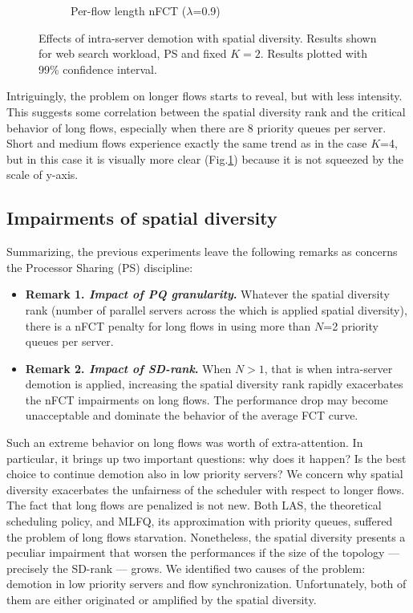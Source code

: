 \begin{figure}
\begin{subfigure}{.5\textwidth}
		\caption{Per-flow length nFCT ($\lambda$=0.9)}
		\label{fig:sdmlfq-variable-N-fct-detailed-K2}
	\end{subfigure}%
	\caption{Effects of intra-server demotion with spatial diversity. Results shown for web search workload, PS and fixed $K=2$. Results plotted with 99\% confidence interval.}
	\label{fig:sdmlfq-variable-N-K2}
\end{figure}%
Intriguingly, the problem on longer flows starts to reveal, but with less intensity. This suggests some correlation between the spatial diversity rank and the critical behavior of long flows, especially when there are 8 priority queues per server.  Short and medium flows experience exactly the same trend as in the case $K$=4, but in this case it is visually more clear (Fig.\ref{fig:sdmlfq-variable-N-fct-detailed-K2}) because it is not squeezed by the scale of y-axis. 
\subsection{Impairments of spatial diversity}
\label{sec:sd-impairments}
Summarizing, the previous experiments leave the following remarks as concerns the Processor Sharing (PS) discipline:
\begin{itemize}
	\item \textbf{Remark 1. \textit{Impact of PQ granularity}.} Whatever the spatial diversity rank (number of parallel servers across the which is applied spatial diversity), there is a nFCT penalty for long flows in using more than $N$=2 priority queues per server.
	\item \textbf{Remark 2. \textit{Impact of SD-rank}.} When $N>1$, that is when intra-server demotion is applied, increasing the spatial diversity rank rapidly exacerbates the nFCT impairments on long flows. The performance drop may become unacceptable and dominate the behavior of the average FCT curve.
\end{itemize}
Such an extreme behavior on long flows was worth of extra-attention. In particular, it brings up two important questions: why does it happen? Is the best choice to continue demotion also in low priority servers?
We concern why spatial diversity exacerbates the unfairness of the scheduler with respect to longer flows. The fact that long flows are penalized is not new. Both LAS, the theoretical scheduling policy, and MLFQ, its approximation with priority queues, suffered the problem of long flows starvation. Nonetheless, the spatial diversity presents a peculiar impairment that worsen the performances if the size of the topology --- precisely the SD-rank --- grows. We identified two causes of the problem: demotion in low priority servers and flow synchronization. Unfortunately, both of them are either originated or amplified by the spatial diversity. 
